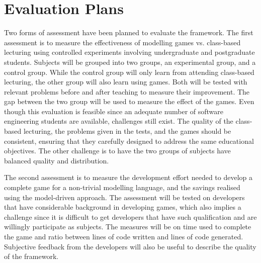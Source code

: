 \documentclass[conference]{IEEEtran}
\begin{document}
\section{Evaluation Plans}
\label{Evaluation Plans} 
Two forms of assessment have been planned to evaluate the framework. The first assessment is to measure the effectiveness of modelling games vs. class-based lecturing using controlled experiments involving undergraduate and postgraduate students. Subjects will be grouped into two groups, an experimental group, and a control group. While the control group will only learn from attending class-based lecturing, the other group will also learn using games. Both will be tested with relevant problems before and after teaching to measure their improvement. The gap between the two group will be used to measure the effect of the games. Even though this evaluation is feasible since an adequate number of software engineering students are available, challenges still exist. The quality of the class-based lecturing, the problems given in the tests, and the games should be consistent, ensuring that they carefully designed to address the same educational objectives. The other challenge is to have the two groups of subjects have balanced quality and distribution. 
  
The second assessment is to measure the development effort needed to develop a complete game for a non-trivial modelling language, and the savings realised using the model-driven approach. The assessment will be tested on developers that have considerable background in developing games, which also implies a challenge since it is difficult to get developers that have such qualification and are willingly participate as subjects. The measures will be on time used to complete the game and ratio between lines of code written and lines of code generated. Subjective feedback from the developers will also be useful to describe the quality of the framework.  
  
\end{document}
